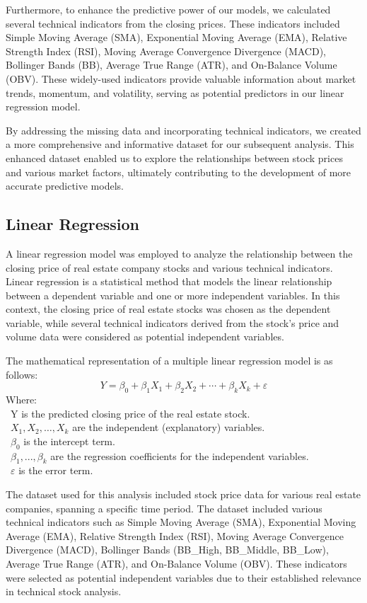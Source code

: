 \documentclass{ieeeojies}
\begin{document}
Furthermore, to enhance the predictive power of our models, we calculated several technical indicators from the closing prices. These indicators included Simple Moving Average (SMA), Exponential Moving Average (EMA), Relative Strength Index (RSI), Moving Average Convergence Divergence (MACD), Bollinger Bands (BB), Average True Range (ATR), and On-Balance Volume (OBV). These widely-used indicators provide valuable information about market trends, momentum, and volatility, serving as potential predictors in our linear regression model.

By addressing the missing data and incorporating technical indicators, we created a more comprehensive and informative dataset for our subsequent analysis. This enhanced dataset enabled us to explore the relationships between stock prices and various market factors, ultimately contributing to the development of more accurate predictive models.
\subsection{Linear Regression}
A linear regression model was employed to analyze the relationship between the closing price of real estate company stocks and various technical indicators. Linear regression is a statistical method that models the linear relationship between a dependent variable and one or more independent variables. In this context, the closing price of real estate stocks was chosen as the dependent variable, while several technical indicators derived from the stock's price and volume data were considered as potential independent variables.

The mathematical representation of a multiple linear regression model is as follows:
\[Y=\beta_0+\beta_1X_1+\beta_2X_2+\cdots+\beta_kX_k+\varepsilon\]
Where:\\
	\indent\textbullet\ Y is the predicted closing price of the real estate stock. \\
	\indent\textbullet\ \(X_1, X_2, \ldots, X_k\) are the independent (explanatory) variables.\\
	\indent\textbullet\ \(\beta_0\) is the intercept term.\\
	\indent\textbullet\ \(\beta_1,..., \beta_k\) are the regression coefficients for the independent variables.\\
	\indent\textbullet\ \(\varepsilon\) is the error term.
  
  The dataset used for this analysis included stock price data for various real estate companies, spanning a specific time period. The dataset included various technical indicators such as Simple Moving Average (SMA), Exponential Moving Average (EMA), Relative Strength Index (RSI), Moving Average Convergence Divergence (MACD), Bollinger Bands (BB\_High, BB\_Middle, BB\_Low), Average True Range (ATR), and On-Balance Volume (OBV). These indicators were selected as potential independent variables due to their established relevance in technical stock analysis.
\end{document}
